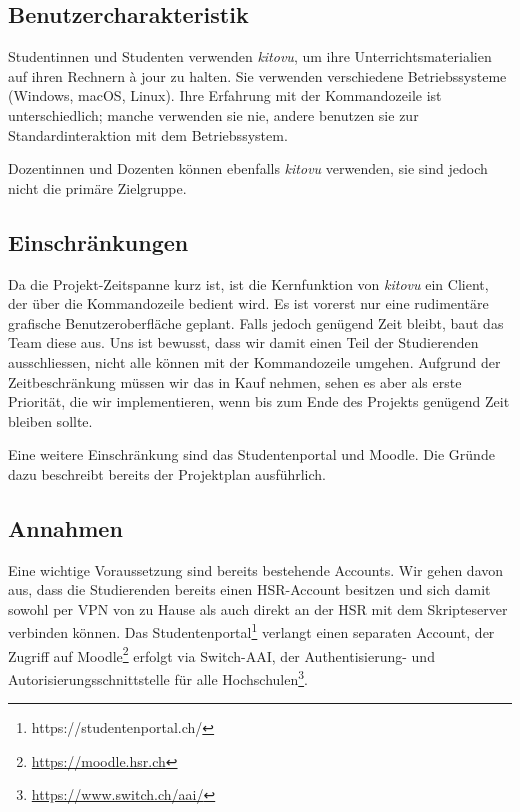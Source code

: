 \documentclass[a4paper]{article}
\begin{document}
\subsection{Benutzercharakteristik}
Studentinnen und Studenten verwenden \emph{kitovu}, um ihre Unterrichtsmaterialien auf ihren Rechnern à jour zu halten. Sie verwenden verschiedene Betriebssysteme (Windows, macOS, Linux). Ihre Erfahrung mit der Kommandozeile ist unterschiedlich; manche verwenden sie nie, andere benutzen sie zur Standardinteraktion mit dem Betriebssystem.

Dozentinnen und Dozenten können ebenfalls \emph{kitovu} verwenden, sie sind jedoch nicht die primäre Zielgruppe.

\subsection{Einschränkungen}
Da die Projekt-Zeitspanne kurz ist, ist die Kernfunktion von \emph{kitovu} ein Client, der über die Kommandozeile bedient wird. Es ist vorerst nur eine rudimentäre grafische Benutzeroberfläche geplant. Falls jedoch genügend Zeit bleibt, baut das Team diese aus. Uns ist bewusst, dass wir damit einen Teil der Studierenden ausschliessen, nicht alle können mit der Kommandozeile umgehen. Aufgrund der Zeitbeschränkung müssen wir das in Kauf nehmen, sehen es aber als erste Priorität, die wir implementieren, wenn bis zum Ende des Projekts genügend Zeit bleiben sollte.

Eine weitere Einschränkung sind das Studentenportal und Moodle. Die Gründe dazu beschreibt bereits der Projektplan ausführlich.


\subsection{Annahmen}
Eine wichtige Voraussetzung sind bereits bestehende Accounts. Wir gehen davon aus, dass die Studierenden bereits einen HSR-Account besitzen und sich damit sowohl per VPN von zu Hause als auch direkt an der HSR mit dem Skripteserver verbinden können. Das Studentenportal\footnote{https://studentenportal.ch/} verlangt einen separaten Account, der Zugriff auf Moodle\footnote{\url{https://moodle.hsr.ch}} erfolgt via Switch-AAI, der Authentisierung- und Autorisierungsschnittstelle für alle Hochschulen\footnote{\url{https://www.switch.ch/aai/}}.
\end{document}
